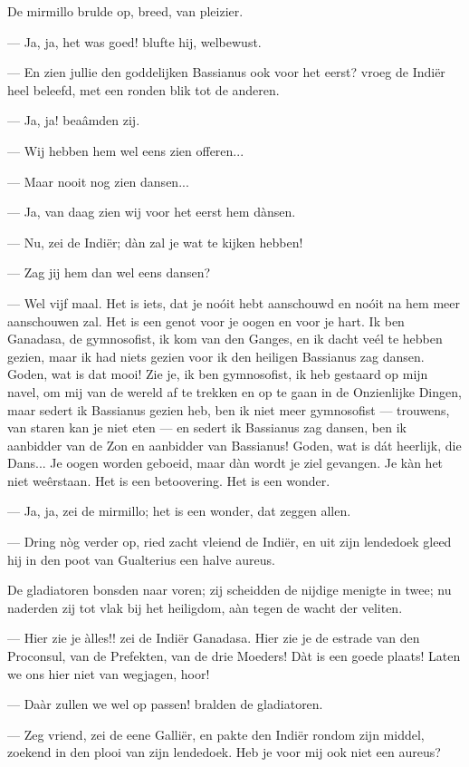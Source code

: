 \documentclass[a4paper, 12pt, oneside, dutch]{article}
\begin{document}
De mirmillo brulde op, breed, van pleizier.

--- Ja, ja, het was goed! blufte hij, welbewust.

--- En zien jullie den goddelijken Bassianus ook voor het eerst? vroeg de Indiër heel beleefd, met een ronden blik tot de anderen.

--- Ja, ja! beaâmden zij.

--- Wij hebben hem wel eens zien offeren...

--- Maar nooit nog zien dansen...

--- Ja, van daag zien wij voor het eerst hem dànsen.

--- Nu, zei de Indiër; dàn zal je wat te kijken hebben!

--- Zag jij hem dan wel eens dansen?

--- Wel vijf maal. Het is iets, dat je noóit hebt aanschouwd en noóit na hem meer aanschouwen zal. Het is een genot voor je oogen en voor je hart. Ik ben Ganadasa, de gymnosofist, ik kom van den Ganges, en ik dacht veél te hebben gezien, maar ik had niets gezien voor ik den heiligen Bassianus zag dansen. Goden, wat is dat mooi! Zie je, ik ben gymnosofist, ik heb gestaard op mijn navel, om mij van de wereld af te trekken en op te gaan in de Onzienlijke Dingen, maar sedert ik Bassianus gezien heb, ben ik niet meer gymnosofist --- trouwens, van staren kan je niet eten --- en sedert ik Bassianus zag dansen, ben ik aanbidder van de Zon en aanbidder van Bassianus! Goden, wat is dát heerlijk, die Dans... Je oogen worden geboeid, maar dàn wordt je ziel gevangen. Je kàn het niet weêrstaan. Het is een betoovering. Het is een wonder.

--- Ja, ja, zei de mirmillo; het is een wonder, dat zeggen allen.

--- Dring nòg verder op, ried zacht vleiend de Indiër, en uit zijn lendedoek gleed hij in den poot van Gualterius een halve aureus.

De gladiatoren bonsden naar voren; zij scheidden de nijdige menigte in twee; nu naderden zij tot vlak bij het heiligdom, aàn tegen de wacht der veliten.

--- Hier zie je àlles!! zei de Indiër Ganadasa. Hier zie je de estrade van den Proconsul, van de Prefekten, van de drie Moeders! Dàt is een goede plaats! Laten we ons hier niet van wegjagen, hoor!

--- Daàr zullen we wel op passen! bralden de gladiatoren.

--- Zeg vriend, zei de eene Galliër, en pakte den Indiër rondom zijn middel, zoekend in den plooi van zijn lendedoek. Heb je voor mij ook niet een aureus?
\end{document}
